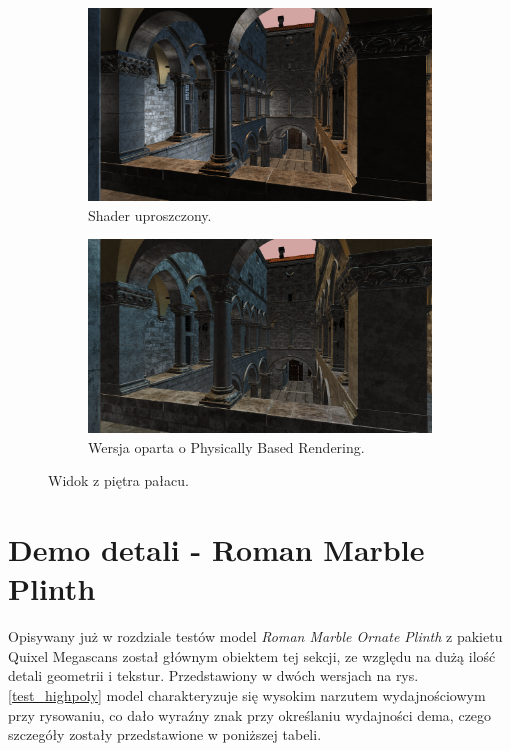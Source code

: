 \begin{figure}[h!]
	\begin{subfigure}{.5\textwidth}
		\centering
		\includegraphics[width=\textwidth]{images/demo_sponza_4.png}
		\caption{Shader uproszczony.}
	\end{subfigure}
	\begin{subfigure}{.5\textwidth}
		\centering
		\includegraphics[width=\textwidth]{images/demo_sponza_4_pbr.png}
		\caption{Wersja oparta o Physically Based Rendering.}
	\end{subfigure}
	\caption{Widok z piętra pałacu.}
	\label{test_sponza_3}
\end{figure}

\vfill
\clearpage

\section{Demo detali - Roman Marble Plinth}
Opisywany już w rozdziale testów model \textit{Roman Marble Ornate Plinth} z pakietu Quixel Megascans został głównym obiektem tej sekcji, ze względu na dużą ilość detali geometrii i tekstur. Przedstawiony w dwóch wersjach na rys. \ref{test_highpoly} model charakteryzuje się wysokim narzutem wydajnościowym przy rysowaniu, co dało wyraźny znak przy określaniu wydajności dema, czego szczegóły zostały przedstawione w poniższej tabeli.

